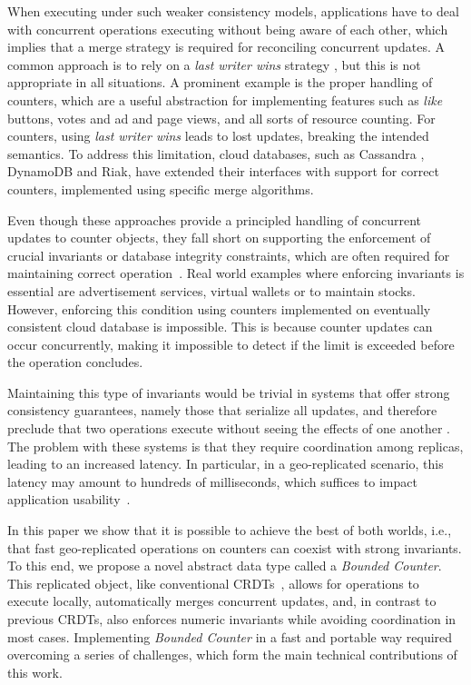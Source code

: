 \documentclass[conference]{IEEEtran}
\newcommand{\InvCounterCRDT}{\emph{Bounded Counter}}
\begin{document}
When executing under such weaker consistency models, applications have to deal with concurrent operations executing without being aware of each other, which implies that a merge strategy is required for reconciling concurrent updates. 
A common approach is to rely on a \emph{last writer wins} strategy \cite{cops,eiger,cassandra}, but this is not appropriate in all situations. 
A prominent example is the proper handling of counters, which are a useful abstraction
for implementing features such as \emph{like} buttons, votes and ad and page views, and all sorts of resource counting. For counters, using \emph{last writer wins} leads to lost updates, breaking the intended semantics.
To address this limitation, cloud databases, such as Cassandra \cite{cassandra:counters}, DynamoDB and Riak\cite{riak:counters}, have extended their interfaces with support for correct counters, implemented 
using specific merge algorithms.




Even though these approaches provide a principled handling of concurrent updates to counter objects, they fall short on supporting the enforcement of crucial invariants or database integrity constraints, which are often required for maintaining correct operation~\cite{redblue}. 
Real world examples where enforcing invariants is essential are advertisement services,
virtual wallets or to maintain stocks.
However, enforcing this condition using counters implemented on eventually consistent 
cloud database is impossible. This is because counter updates can occur concurrently, 
making it impossible to detect if the limit is exceeded before the operation concludes.



Maintaining this type of invariants would be trivial in systems that offer strong consistency guarantees, namely those that serialize all updates, and therefore preclude that two operations execute without seeing the effects of one another \cite{spanner,walter,redblue}. 
The problem with these systems is that they require coordination among replicas, leading to an increased latency. In particular, in a geo-replicated scenario, this latency may amount to hundreds of milliseconds, which suffices to impact application usability~\cite{Schurman09latency}.

In this paper we show that it is possible to achieve the best of both worlds, i.e.,
that fast geo-replicated operations on counters can coexist with strong invariants.
To this end, we propose a novel abstract data type 
called a \InvCounterCRDT{}.
This replicated object, like conventional CRDTs~\cite{crdts}, allows for 
operations to execute locally, automatically merges concurrent updates, and, in contrast to previous CRDTs, also
enforces numeric invariants while avoiding coordination in most cases.
Implementing \InvCounterCRDT{} in a fast and portable way required overcoming
a series of challenges, which form the main technical contributions of this
work.
\end{document}
